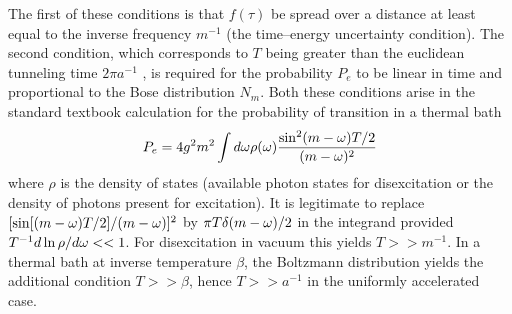 \documentclass[12pt]{article}
\begin{document}
 The first of these conditions is  that $f(\tau)$ be spread
over a distance at least equal to the inverse frequency $m^{-1}$ (the
time--energy uncertainty condition). The second condition, which corresponds to
$T$ being greater than the euclidean tunneling time $2 \pi a^{-1}$ \cite{pbt},
is
required for the probability $P_{e}$ to be linear in time and proportional to
the Bose distribution $N_m$. Both these conditions arise in the
standard textbook calculation for the probability of transition in a thermal
bath \begin{equation}
P_e= 4
g^2
m^2
\int
d\mbox{$ \omega $}
\rho (\mbox{$ \omega $}) {\sin^2(m-\mbox{$ \omega $})T/2 \over (m-\mbox{$ \omega $})^2}
\label{golder}
\end{equation}
 where $\rho$ is the density of states
(available  photon states for disexcitation or the density of photons present
for excitation). It is legitimate to
replace  $[\sin[(m-\mbox{$ \omega $})T/2] / (m-\mbox{$ \omega $})]^2$ by $
\pi T \delta (m-\mbox{$ \omega $})/2$ in the integrand provided $T^{-1}d \ln \rho / d \mbox{$ \omega $}
<<1$. For disexcitation in vacuum this yields $T>>m^{-1}$. In a thermal bath at
inverse temperature $\beta$, the Boltzmann distribution yields the additional
condition
$T>> \beta$, hence $T>>a^{-1}$ in the uniformly accelerated case.
\end{document}
